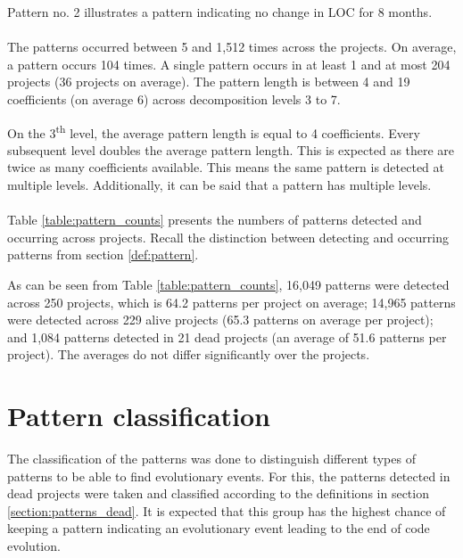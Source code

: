 

\noindent
Pattern no. 2 illustrates a pattern indicating no change in LOC for 8 months.

\paragraph{}
The patterns occurred between 5 and 1,512 times across the projects. On
average, a pattern occurs 104 times. A single pattern occurs in at least 1 and
at most 204 projects (36 projects on average). The pattern length is between 4
and 19 coefficients (on average 6) across decomposition levels 3 to 7.

On the 3\textsuperscript{th} level, the average pattern length is equal to 4
coefficients. Every subsequent level doubles the average pattern length. This
is expected as there are twice as many coefficients available. This means the
same pattern is detected at multiple levels. Additionally, it can be said that
a pattern has multiple levels.

\paragraph{}
Table \ref{table:pattern_counts} presents the numbers of patterns
detected and occurring across projects. Recall the distinction between
detecting and occurring patterns from section \ref{def:pattern}.



\noindent
As can be seen from Table \ref{table:pattern_counts}, 16,049 patterns were
detected across 250 projects, which is 64.2 patterns per project on average;
14,965 patterns were detected across 229 alive projects (65.3 patterns on
average per project); and 1,084 patterns detected in 21 dead projects (an
average of 51.6 patterns per project). The averages do not differ significantly
over the projects.



\section{Pattern classification}
The classification of the patterns was done to distinguish different types of
patterns to be able to find evolutionary events. For this, the patterns
detected in dead projects were taken and classified according to
the definitions in section \ref{section:patterns_dead}. It is expected that
this group has the highest chance of keeping a pattern indicating an
evolutionary event leading to the end of code evolution.

